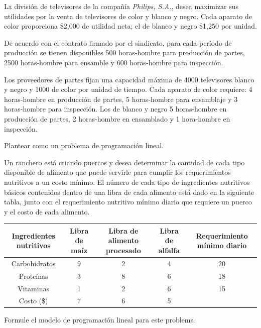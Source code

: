 \begin{Ejer} La divisi\'on de televisores de la compa\~n\'ia \textit{Philips, S.A.}, desea maximizar sus utilidades por la venta de televisores de color y blanco y negro. Cada aparato de color proporciona \$2,000 de utilidad neta; el de blanco y negro \$1,250 por unidad.

De acuerdo con el contrato firmado por el sindicato, para cada per\'iodo de producci\'on se tienen disponibles 500 horas-hombre para producci\'on de partes, 2500 horas-hombre para ensamble y 600 horas-hombre para inspecci\'on.

Los proveedores de partes fijan una capacidad m\'axima de 4000 televisores blanco y negro y 1000 de color por unidad de tiempo. Cada aparato de color requiere: 4 horas-hombre en producci\'on de partes, 5 horas-hombre para ensamblaje y 3 horas-hombre para inspecci\'on. Los de blanco y negro 5 horas-hombre en producci\'on de partes, 2 horas-hombre en ensamblado y 1 hora-hombre en inspecci\'on.

Plantear como un problema de programaci\'on lineal.
\end{Ejer}



\begin{Ejer}
Un ranchero est\'a criando puercos y desea determinar la cantidad de cada tipo disponible de alimento que puede servirle para cumplir los requerimientos nutritivos a un costo m\'inimo. El n\'umero de cada tipo de ingredientes nutritivos b\'asicos contenidos dentro de una libra de cada alimento est\'a dado en la siguiente tabla, junto con el requerimiento nutritivo m\'inimo diario que requiere un puerco y el costo de cada alimento.

\begin{center}
\begin{tabular}{c|ccc|c}
Ingredientes nutritivos & Libra de ma\'iz & Libra de alimento procesado & Libra de alfalfa & Requerimiento m\'inimo diario \\
\hline
Carbohidratos & 9 & 2 & 4 & 20 \\
Prote\'inas & 3 & 8 & 6 & 18 \\
Vitaminas & 1 & 2 & 6 & 15 \\
\hline
Costo (\$) & 7 & 6 & 5 & \\
\end{tabular}
\end{center}

Formule el modelo de programaci\'on lineal para este problema.
\end{Ejer}

